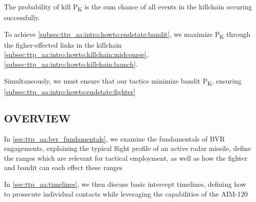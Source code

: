 \begin{tcoloritemize}
    \medskip
    The probability of kill P\textsubscript{K} is the sum chance of all events in the killchain occuring successfully.

    To achieve \ref{subsec:ttp_aa:intro:howto:endstate:bandit},
    we maximize P\textsubscript{K} through the figher-effected links in the killchain
    \ref{subsec:ttp_aa:intro:howto:killchain:midcourse},
    \ref{subsec:ttp_aa:intro:howto:killchain:launch}.

    \medskip
    Simultaneously, we must ensure that our tactics minimize bandit P\textsubscript{K}, 
    ensuring \ref{subsec:ttp_aa:intro:howto:endstate:fighter}
\end{tcoloritemize}

\clearpage

\subsection{OVERVIEW}
\begin{tcoloritemize}
    \blueitem[Fundamentals] 
    In \cref{sec:ttp_aa:bvr_fundamentals}, 
    we examine the fundamentals of BVR engagements, 
    explaining the typical flight profile of an active radar missile,
    define the ranges which are relevant for tactical employment,
    as well as how the fighter and bandit can each effect these ranges

    In \cref{sec:ttp_aa:timelines}, 
    we then discuss basic intercept timelines, 
    defining how to prosecute individual contacts while leveraging the capabilities of the AIM-120


\end{tcoloritemize}

\clearpage


